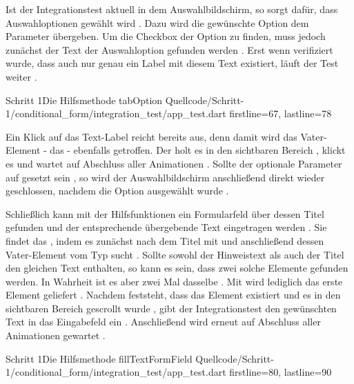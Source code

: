 Ist der Integrationstest aktuell in dem Auswahlbildschirm, so sorgt  dafür, dass Auswahloptionen gewählt wird \Lst{\ref{lst:Schritt1HilfsmethodeTabOption}}. Dazu wird die gewünschte Option dem Parameter  übergeben. Um die Checkbox der Option zu finden, muss jedoch zunächst der Text der Auswahloption gefunden werden . Erst wenn verifiziert wurde, dass auch nur genau ein Label mit diesem Text existiert, läuft der Test weiter . 

\begin{alexlisting}{Schritt 1}{Die Hilfsmethode tabOption}
  {Quellcode/Schritt-1/conditional_form/integration_test/app_test.dart}
  {firstline=67, lastline=78}
  \label{lst:Schritt1HilfsmethodeTabOption}
\end{alexlisting}

Ein Klick auf das Text-Label reicht bereits aus, denn damit wird das Vater-Element - das  - ebenfalls getroffen. Der  holt es in den sichtbaren Bereich , klickt es  und wartet auf Abschluss aller Animationen . Sollte der optionale Parameter  auf  gesetzt sein , so wird der Auswahlbildschirm anschließend direkt wieder geschlossen, nachdem die Option ausgewählt wurde  . 
  
Schließlich kann mit der Hilfsfunktionen  ein Formularfeld über dessen Titel gefunden und der entsprechende übergebende Text eingetragen werden \Lst{\ref{lst:Schritt1HilfsmethodeFillTextFormField}}. Sie findet das , indem es zunächst nach dem Titel mit  und anschließend dessen Vater-Element vom Typ  sucht . Sollte sowohl der Hinweistext als auch der Titel den gleichen Text enthalten, so kann es sein, dass zwei solche Elemente gefunden werden. In Wahrheit ist es aber zwei Mal dasselbe . Mit  wird lediglich das erste Element geliefert .
Nachdem feststeht, dass das Element existiert  und es in den sichtbaren Bereich gescrollt wurde , gibt der Integrationstest den gewünschten Text in das Eingabefeld ein . Anschließend wird erneut auf Abschluss aller Animationen gewartet .

\begin{alexlisting}{Schritt 1}{Die Hilfsmethode fillTextFormField}
  {Quellcode/Schritt-1/conditional_form/integration_test/app_test.dart}
  {firstline=80, lastline=90}
  \label{lst:Schritt1HilfsmethodeFillTextFormField}
\end{alexlisting}

